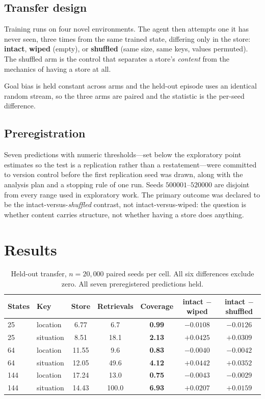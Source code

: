 \documentclass[11pt]{article}
\begin{document}
\subsection{Transfer design}

Training runs on four novel environments. The agent then attempts one it has
never seen, three times from the same trained state, differing only in the
store: \textbf{intact}, \textbf{wiped} (empty), or \textbf{shuffled} (same
size, same keys, values permuted). The shuffled arm is the control that
separates a store's \emph{content} from the mechanics of having a store at all.

Goal bias is held constant across arms and the held-out episode uses an
identical random stream, so the three arms are paired and the statistic is the
per-seed difference.

\subsection{Preregistration}

Seven predictions with numeric thresholds---set below the exploratory point
estimates so the test is a replication rather than a restatement---were
committed to version control before the first replication seed was drawn, along
with the analysis plan and a stopping rule of one run. Seeds
$500001$--$520000$ are disjoint from every range used in exploratory work.
The primary outcome was declared to be the intact-versus-\emph{shuffled}
contrast, not intact-versus-wiped: the question is whether content carries
structure, not whether having a store does anything.

\section{Results}

\begin{table}[h]
\centering
\begin{tabular}{llccccc}
\toprule
States & Key & Store & Retrievals & \textbf{Coverage} & intact $-$ wiped & intact $-$ shuffled \\
\midrule
25 & location & 6.77 & 6.7 & \textbf{0.99} & $-0.0108$ & $-0.0126$ \\
25 & situation & 8.51 & 18.1 & \textbf{2.13} & $+0.0425$ & $+0.0309$ \\
64 & location & 11.55 & 9.6 & \textbf{0.83} & $-0.0040$ & $-0.0042$ \\
64 & situation & 12.05 & 49.6 & \textbf{4.12} & $+0.0442$ & $+0.0352$ \\
144 & location & 17.24 & 13.0 & \textbf{0.75} & $-0.0043$ & $-0.0029$ \\
144 & situation & 14.43 & 100.0 & \textbf{6.93} & $+0.0207$ & $+0.0159$ \\
\bottomrule
\end{tabular}
\caption{Held-out transfer, $n = 20{,}000$ paired seeds per cell. All six
differences exclude zero. All seven preregistered predictions held.}
\end{table}
\end{document}
